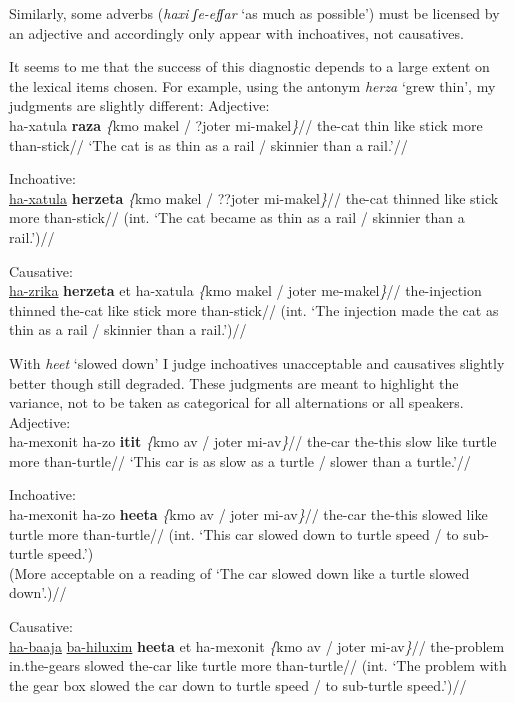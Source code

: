 Similarly, some adverbs (\emph{haxi ʃe-efʃar} `as much as possible') must be licensed by an adjective and accordingly only appear with inchoatives, not causatives.

It seems to me that the success of this diagnostic depends to a large extent on the lexical items chosen. For example, using the antonym \emph{herza} `grew thin', my judgments are slightly different:
\pex
  \a Adjective:\\ \begingl
    \gla ha-xatula \textbf{raza} \emph{\{}kmo makel / ?joter mi-makel\emph{\}}//
    \glb the-cat thin like stick {} more than-stick//
    \glft `The cat is as thin as a rail / skinnier than a rail.'//
  \endgl
  
  \a Inchoative:\\ \begingl
    \gla{}\underline{ha-xatula} \textbf{herzeta} \emph{\{}kmo makel / ??joter mi-makel\emph{\}}//
    \glb the-cat thinned like stick {} more than-stick//
    \glft (int. `The cat became as thin as a rail / skinnier than a rail.')//
  \endgl

  \a Causative:\\ \begingl
    \gla {}\underline{ha-zrika} \textbf{herzeta} et ha-xatula \emph{\{}kmo makel / joter me-makel\emph{\}}//
    \glb the-injection thinned  the-cat like stick {} more than-stick//
    \glft (int. `The injection made the cat as thin as a rail / skinnier than a rail.')//
  \endgl
\xe

With \emph{heet} `slowed down' I judge inchoatives unacceptable and causatives slightly better though still degraded. These judgments are meant to highlight the variance, not to be taken as categorical for all alternations or all speakers.
\pex
	\a Adjective:\\ \begingl
		\gla ha-mexonit ha-zo \textbf{itit} \emph{\{}kmo {\texttslig}av / joter mi-{\texttslig}av\emph{\}}//
		\glb the-car the-this slow like turtle {} more than-turtle//
		\glft `This car is as slow as a turtle / slower than a turtle.'//
	\endgl

	\a Inchoative:\\ \begingl
		\gla\ljudge{*}ha-mexonit ha-zo \textbf{heeta} \emph{\{}kmo {\texttslig}av / joter mi-{\texttslig}av\emph{\}}//
		\glb the-car the-this slowed like turtle {} more than-turtle//
		\glft (int. `This car slowed down to turtle speed / to sub-turtle speed.')\\
			(More acceptable on a reading of `The car slowed down like a turtle slowed down'.)//
	\endgl

	\a Causative:\\ \begingl
		\gla{}\underline{ha-baaja} \underline{ba-hiluxim} \textbf{heeta} et ha-mexonit \emph{\{}kmo {\texttslig}av / joter mi-{\texttslig}av\emph{\}}//
		\glb the-problem in.the-gears slowed  the-car like turtle {} more than-turtle//
		\glft (int. `The problem with the gear box slowed the car down to turtle speed / to sub-turtle speed.')//
	\endgl
\xe


